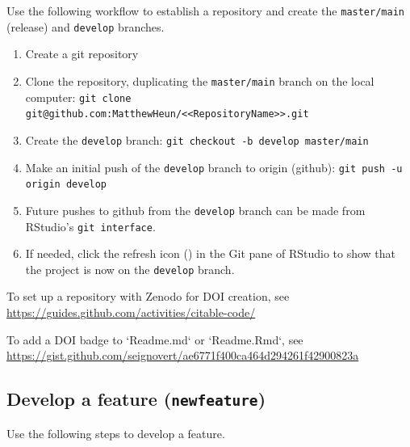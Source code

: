 \documentclass{article}
\begin{document}
Use the following workflow to establish a repository and
create the \texttt{master/main} (release) and \texttt{develop} branches.
%
\begin{enumerate}

  \item Create a git repository

  \item Clone the repository, duplicating the \texttt{master/main} branch on the local computer:
  		\texttt{git clone git@github.com:MatthewHeun/<<RepositoryName>>.git}

  \item Create the \texttt{develop} branch:
  		\texttt{git checkout -b develop master/main}

  \item Make an initial push of the \texttt{develop} branch to origin (github):
        \texttt{git push -u origin develop}

  \item Future pushes to github from the \texttt{develop} branch
  		can be made from RStudio's \texttt{git interface}.

  \item If needed, click the refresh icon
  		() in the Git pane of RStudio to
  		show that the project is now on the \texttt{develop} branch.

\end{enumerate}

To set up a repository with Zenodo for DOI creation, see
\url{https://guides.github.com/activities/citable-code/}

To add a DOI badge to `Readme.md` or `Readme.Rmd`, see
\url{https://gist.github.com/seignovert/ae6771f400ca464d294261f42900823a}


\subsection{Develop a feature (\texttt{newfeature})}
\label{sec:feature}

Use the following steps to develop a feature.
\end{document}
